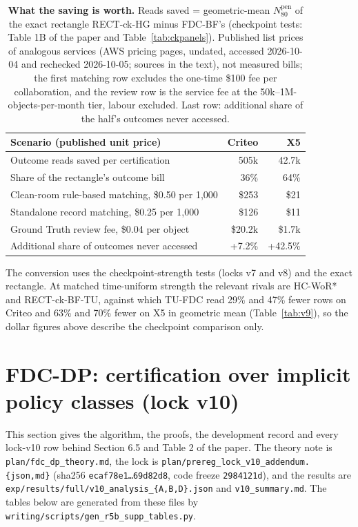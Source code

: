 \documentclass[sigconf,anonymous,review]{acmart}
\newcommand{\Npen}{N_{80}^{\text{pen}}}
\begin{document}
\begin{table}[H]
\caption{\textbf{What the saving is worth.} Reads saved = geometric-mean $\Npen$ of the exact rectangle RECT-ck-HG minus FDC-BF's (checkpoint tests: Table 1B of the paper and Table~\ref{tab:ckpanels}). Published list prices of analogous services (AWS pricing pages, undated, accessed 2026-10-04 and rechecked 2026-10-05; sources in the text), not measured bills; the first matching row excludes the one-time \$100 fee per collaboration, and the review row is the service fee at the 50k--1M-objects-per-month tier, labour excluded. Last row: additional share of the half's outcomes never accessed.}
\label{tab:cost}
\footnotesize
\setlength{\tabcolsep}{3pt}
\begin{tabular}{@{}lrr@{}}
\toprule
Scenario (published unit price) & Criteo & X5 \\
\midrule
Outcome reads saved per certification & 505k & 42.7k \\
Share of the rectangle's outcome bill & 36\% & 64\% \\
Clean-room rule-based matching, \$0.50 per 1,000 & \$253 & \$21 \\
Standalone record matching, \$0.25 per 1,000 & \$126 & \$11 \\
Ground Truth review fee, \$0.04 per object & \$20.2k & \$1.7k \\
Additional share of outcomes never accessed & +7.2\% & +42.5\% \\
\bottomrule
\end{tabular}
\end{table}

\noindent The conversion uses the checkpoint-strength tests (locks v7 and v8) and the exact rectangle. At matched time-uniform strength the relevant rivals are HC-WoR* and RECT-ck-BF-TU, against which TU-FDC read 29\% and 47\% fewer rows on Criteo and 63\% and 70\% fewer on X5 in geometric mean (Table~\ref{tab:v9}), so the dollar figures above describe the checkpoint comparison only.

\section{FDC-DP: certification over implicit policy classes (lock v10)}\label{app:fdcdp}

This section gives the algorithm, the proofs, the development record and every lock-v10 row behind Section 6.5 and Table 2 of the paper. The theory note is \texttt{plan/fdc\_dp\_theory.md}, the lock is \texttt{plan/prereg\_lock\_v10\_addendum.\{json,md\}} (sha256 \texttt{ecaf78e1\dots69d82d8}, code freeze \texttt{2984121d}), and the results are \texttt{exp/results/full/v10\_analysis\_\{A,B,D\}.json} and \texttt{v10\_summary.md}. The tables below are generated from these files by \texttt{writing/scripts/gen\_r5b\_supp\_tables.py}.
\end{document}

